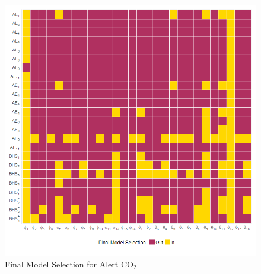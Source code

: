 \begin{figure}[htbp]
	\caption{Final Model Selection for Alert $\textrm{CO}_2$ }
	\center
	\label{fig:alertselect}
	\includegraphics[scale=0.42]{alertselect}
\end{figure}

